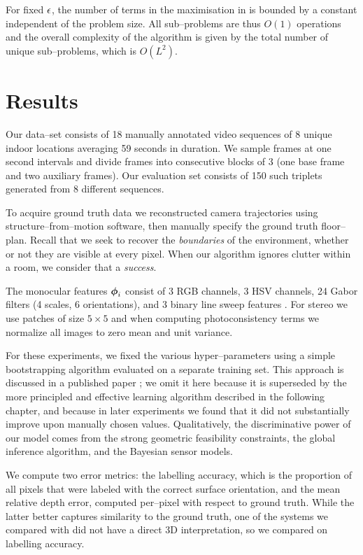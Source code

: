 For fixed $\RoundoffEps$, the number of terms in the maximisation in
 is bounded by a constant independent of
the problem size. All sub--problems are thus $O(1)$ operations and the
overall complexity of the algorithm is given by the total number of
unique sub--problems, which is $O(L^2)$.

\section{Results}
\label{sect:results}
Our data--set consists of 18 manually annotated video sequences of 8
unique indoor locations averaging 59 seconds in duration. We sample
frames at one second intervals and divide frames into consecutive
blocks of 3 (one base frame and two auxiliary frames). Our evaluation
set consists of 150 such triplets generated from 8 different
sequences.

To acquire ground truth data we reconstructed camera trajectories
using structure--from--motion software, then manually specify the
ground truth floor--plan. Recall that we seek to recover the
\textit{boundaries} of the environment, whether or not they are
visible at every pixel. When our algorithm ignores clutter within a
room, we consider that a \textit{success}.

The monocular features $\Feature_i$ consist of 3 RGB channels, 3 HSV
channels, 24 Gabor filters (4 scales, 6 orientations), and 3 binary
line sweep features \cite{Lee09}. For stereo we use patches of size
$5 \times 5$ and when computing photoconsistency terms we normalize
all images to zero mean and unit variance.

For these experiments, we fixed the various hyper--parameters using a
simple bootstrapping algorithm evaluated on a separate training
set. This approach is discussed in a published paper \cite{Flint11};
we omit it here because it is superseded by the more principled and
effective learning algorithm described in the following chapter, and
because in later experiments we found that it did not substantially
improve upon manually chosen values. Qualitatively, the discriminative
power of our model comes from the strong geometric feasibility
constraints, the global inference algorithm, and the Bayesian sensor
models.

We compute two error metrics: the labelling accuracy, which is the
proportion of all pixels that were labeled with the correct surface
orientation, and the mean relative depth error, computed per--pixel
with respect to ground truth. While the latter better captures
similarity to the ground truth, one of the systems we compared with
did not have a direct 3D interpretation, so we compared on labelling
accuracy.

